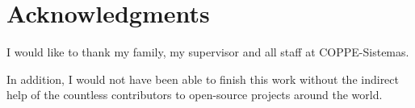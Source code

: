 \chapter*{Acknowledgments}

I would like to thank my family, my supervisor and all staff at COPPE-Sistemas. 

In addition, I would not have been able to finish this work without the indirect help of the countless contributors to open-source projects around the world.